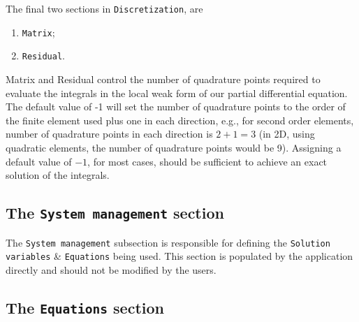 The final two sections in \texttt{Discretization}, are
\begin{enumerate}
\item \texttt{Matrix};
\item \texttt{Residual}.
\end{enumerate}
Matrix and Residual control the number of quadrature points required to evaluate the integrals in the local weak form of our partial differential equation. The default value of -1 will set the number of quadrature points to the order of the finite element used plus one in each direction, e.g., for second order elements, number of quadrature points in each direction is $2 + 1 = 3$ (in 2D, using quadratic elements, the number of quadrature points would be 9). Assigning a default value of $-1$, for most cases, should be sufficient to achieve an exact solution of the integrals.

\subsection{The \texttt{System management} section}

The \texttt{System management} subsection is responsible for defining the \texttt{Solution variables} \&  \texttt{Equations} being used. This section is populated by the application directly and should not be modified by the users.

\subsection{The \texttt{Equations} section}

